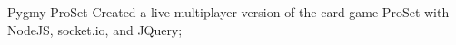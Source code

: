 \project
    {Pygmy ProSet}
    {
        Created a live multiplayer version of the card game ProSet with NodeJS, socket.io, and
        JQuery;
    }
